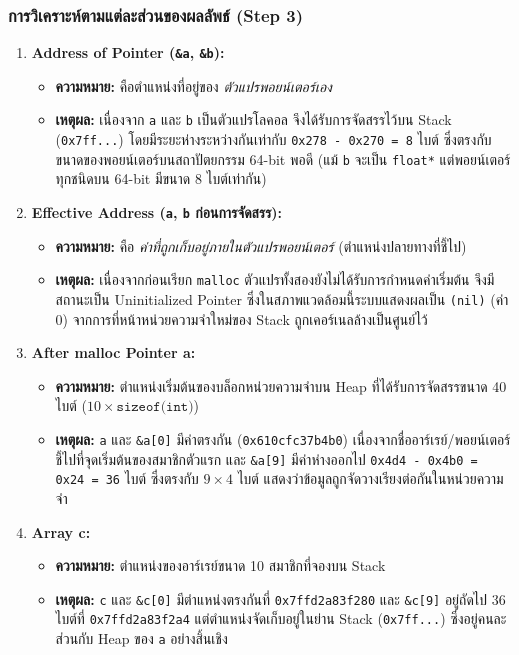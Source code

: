 \documentclass[a4paper,11pt]{article}
\newcommand{\code}[1]{\texttt{#1}}
\begin{document}
\subsubsection{การวิเคราะห์ตามแต่ละส่วนของผลลัพธ์ (Step 3)}

\begin{enumerate}[leftmargin=*]
  \item \textbf{Address of Pointer (\code{\&a}, \code{\&b}):}
    \begin{itemize}
      \item \textbf{ความหมาย:} คือตำแหน่งที่อยู่ของ \emph{ตัวแปรพอยน์เตอร์เอง}
      \item \textbf{เหตุผล:} เนื่องจาก \code{a} และ \code{b} เป็นตัวแปรโลคอล จึงได้รับการจัดสรรไว้บน Stack (\code{0x7ff...}) โดยมีระยะห่างระหว่างกันเท่ากับ \code{0x278 - 0x270 = 8} ไบต์ ซึ่งตรงกับขนาดของพอยน์เตอร์บนสถาปัตยกรรม 64-bit พอดี (แม้ \code{b} จะเป็น \code{float*} แต่พอยน์เตอร์ทุกชนิดบน 64-bit มีขนาด 8 ไบต์เท่ากัน)
    \end{itemize}

  \item \textbf{Effective Address (\code{a}, \code{b} ก่อนการจัดสรร):}
    \begin{itemize}
      \item \textbf{ความหมาย:} คือ \emph{ค่าที่ถูกเก็บอยู่ภายในตัวแปรพอยน์เตอร์} (ตำแหน่งปลายทางที่ชี้ไป)
      \item \textbf{เหตุผล:} เนื่องจากก่อนเรียก \code{malloc} ตัวแปรทั้งสองยังไม่ได้รับการกำหนดค่าเริ่มต้น จึงมีสถานะเป็น Uninitialized Pointer ซึ่งในสภาพแวดล้อมนี้ระบบแสดงผลเป็น \code{(nil)} (ค่า $0$) จากการที่หน้าหน่วยความจำใหม่ของ Stack ถูกเคอร์เนลล้างเป็นศูนย์ไว้
    \end{itemize}

  \item \textbf{After malloc Pointer a:}
    \begin{itemize}
      \item \textbf{ความหมาย:} ตำแหน่งเริ่มต้นของบล็อกหน่วยความจำบน Heap ที่ได้รับการจัดสรรขนาด 40 ไบต์ ($10 \times \code{sizeof(int)}$)
      \item \textbf{เหตุผล:} \code{a} และ \code{\&a[0]} มีค่าตรงกัน (\code{0x610cfc37b4b0}) เนื่องจากชื่ออาร์เรย์/พอยน์เตอร์ชี้ไปที่จุดเริ่มต้นของสมาชิกตัวแรก และ \code{\&a[9]} มีค่าห่างออกไป \code{0x4d4 - 0x4b0 = 0x24 = 36} ไบต์ ซึ่งตรงกับ $9 \times 4$ ไบต์ แสดงว่าข้อมูลถูกจัดวางเรียงต่อกันในหน่วยความจำ
    \end{itemize}

  \item \textbf{Array c:}
    \begin{itemize}
      \item \textbf{ความหมาย:} ตำแหน่งของอาร์เรย์ขนาด 10 สมาชิกที่จองบน Stack
      \item \textbf{เหตุผล:} \code{c} และ \code{\&c[0]} มีตำแหน่งตรงกันที่ \code{0x7ffd2a83f280} และ \code{\&c[9]} อยู่ถัดไป 36 ไบต์ที่ \code{0x7ffd2a83f2a4} แต่ตำแหน่งจัดเก็บอยู่ในย่าน Stack (\code{0x7ff...}) ซึ่งอยู่คนละส่วนกับ Heap ของ \code{a} อย่างสิ้นเชิง
    \end{itemize}


\end{enumerate}
\end{document}
